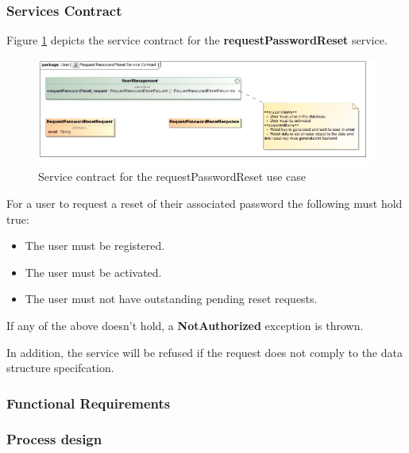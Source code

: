 \subsubsection{Services Contract}
Figure \ref{fig:requestPasswordResetServicesContract} depicts the service contract for the \textbf{requestPasswordReset} service.

\begin{figure}[H]
  \begin{center}
  \includegraphics[scale=0.55]{../Diagrams and Charts/Users/Request Password Reset Service Contract.jpg}
  \caption{Service contract for the requestPasswordReset use case}
  \end{center}
  \label{fig:requestPasswordResetServicesContract}
\end{figure}

For a user to request a reset of their associated password the following must hold true:
\begin{itemize}
	\item The user must be registered.
	\item The user must be activated.
	\item The user must not have outstanding pending reset requests.
\end{itemize}

If any of the above doesn't hold, a \textbf{NotAuthorized} exception is thrown.

In addition, the service will be refused if the request does not comply to the data structure specifcation.

\subsubsection{Functional Requirements}

\subsubsection{Process design}